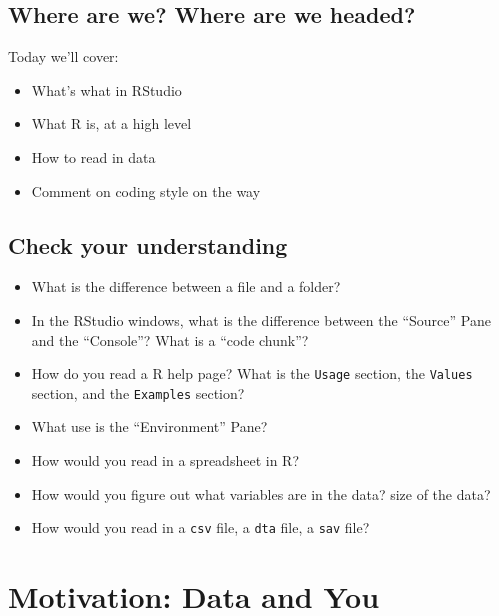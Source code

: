 \documentclass[]{book}
\providecommand{\tightlist}{%
  \setlength{\itemsep}{0pt}\setlength{\parskip}{0pt}}
\theoremstyle{definition}
\theoremstyle{definition}
\theoremstyle{definition}
\theoremstyle{remark}
\begin{document}
\hypertarget{where-are-we-where-are-we-headed}{%
\subsection*{Where are we? Where are we headed?}\label{where-are-we-where-are-we-headed}}

Today we'll cover:

\begin{itemize}
\tightlist
\item
  What's what in RStudio
\item
  What R is, at a high level
\item
  How to read in data
\item
  Comment on coding style on the way
\end{itemize}

\hypertarget{check-your-understanding}{%
\subsection*{Check your understanding}\label{check-your-understanding}}

\begin{itemize}
\tightlist
\item
  What is the difference between a file and a folder?
\item
  In the RStudio windows, what is the difference between the ``Source'' Pane and the ``Console''? What is a ``code chunk''?
\item
  How do you read a R help page? What is the \texttt{Usage} section, the \texttt{Values} section, and the \texttt{Examples} section?
\item
  What use is the ``Environment'' Pane?
\item
  How would you read in a spreadsheet in R?
\item
  How would you figure out what variables are in the data? size of the data?
\item
  How would you read in a \texttt{csv} file, a \texttt{dta} file, a \texttt{sav} file?
\end{itemize}

\hypertarget{motivation-data-and-you}{%
\section{Motivation: Data and You}\label{motivation-data-and-you}}
\end{document}

